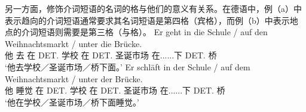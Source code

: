 \eal
{}
\zl
\largerpage%
另一方面，修饰介词短语的名词的格与他们的意义有关系。在德语中，例（a）中表示趋向的介词短语通常要求其名词短语是第四格（宾格），而例（b）中表示地点的介词短语则需要是第三格（与格）。
\eal
\ex
\gll Er geht in die Schule / auf den Weihnachtsmarkt / unter die Brücke.\\
	 他 去 在 DET.\acc{} 学校 {} 在 DET.\acc{} 圣诞市场 {} 在......下 DET.\acc{} 桥\\
\glt `他去学校／圣诞市场／桥下面。'
\ex 
\gll Er schläft in der Schule / auf dem Weihnachtsmarkt / unter der Brücke.\\
	 他 睡觉 在 DET.\dat{} 学校 {} 在 DET.\dat{} 圣诞市场 {} 在......下 DET.\dat{} 桥\\
\glt `他在学校／圣诞市场／桥下面睡觉。'
\zl

